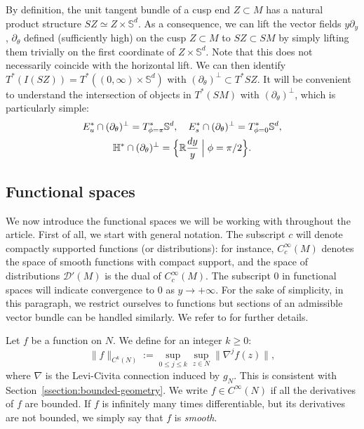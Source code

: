 \documentclass[10pt]{amsart}
\newcommand{\R}{\mathbb{R}}
\newcommand{\HH}{\mathbb{H}}
\newcommand{\Ss}{\mathbb{S}}
\newcommand{\mc}{\mathcal}
\newcommand{\ZZ}{I(SZ)}
\theoremstyle{plain}
\theoremstyle{definition}
\begin{document}
By definition, the unit tangent bundle of a cusp end $Z \subset M$ has a natural product structure $SZ \simeq Z \times \Ss^d$. As a consequence, we can lift the vector fields $y\partial_y$, $\partial_\theta$ defined (sufficiently high) on the cusp $Z \subset M$ to $SZ \subset SM$ by simply lifting them trivially on the first coordinate of $Z \times \Ss^d$. Note that this does not necessarily coincide with the horizontal lift. We can then identify $T^\ast(\ZZ) = T^\ast ((0,\infty)\times\Ss^d)$ with $(\partial_\theta)^\perp\subset T^\ast SZ$. It will be convenient to understand the intersection of objects in $T^\ast (SM)$ with $(\partial_\theta)^\perp$, which is particularly simple:
\begin{equation}\label{eq:indicial-WF}
\begin{gathered}
E^\ast_u\cap(\partial_\theta)^\perp = T^\ast_{\phi=\pi}\Ss^d,\quad E^\ast_s\cap(\partial_\theta)^\perp = T^\ast_{\phi=0}\Ss^d,\\ \HH^\ast \cap (\partial_\theta)^\perp = \Bigl\{\R\frac{dy}{y} \Bigm|\phi= \pi/2\Bigr\}.
\end{gathered}
\end{equation}

\subsection{Functional spaces}

\label{sec:fun}

We now introduce the functional spaces we will be working with throughout the article. First of all, we start with general notation. The subscript $c$ will denote compactly supported functions (or distributions): for instance, $C^\infty_c(M)$ denotes the space of smooth functions with compact support, and the space of distributions $\mc{D}'(M)$ is the dual of $C^\infty_c(M)$. The subscript $0$ in functional spaces will indicate convergence to $0$ as $y \to +\infty$. For the sake of simplicity, in this paragraph, we restrict ourselves to functions but sections of an admissible vector bundle can be handled similarly. We refer to \cite[\S 2.1.2]{Bonthonneau-Lefeuvre-19-1} for further details.

Let $f$ be a function on $N$. We define for an integer $k \geq 0$:
\[
\|f\|_{C^k(N)} := \sup_{0 \leq j \leq k} \sup_{z \in N}\|\nabla^j f(z)\|,
\]
where $\nabla$ is the Levi-Civita connection induced by $g_N$. This is consistent with Section~\ref{ssection:bounded-geometry}. We write $f \in C^\infty(N)$ if all the derivatives of $f$ are bounded. If $f$ is infinitely many times differentiable, but its derivatives are not bounded, we simply say that $f$ is \textit{smooth}.
\end{document}

